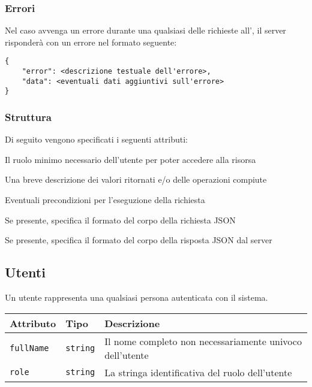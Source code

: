     \subsubsection{Errori}

        Nel caso avvenga un errore durante una qualsiasi delle richieste all', il server risponderà
        con un errore nel formato  seguente:

        \begin{lstlisting}[basicstyle={\ttfamily}]
{
    "error": <descrizione testuale dell'errore>,
    "data": <eventuali dati aggiuntivi sull'errore>
}
        \end{lstlisting}

    \subsubsection{Struttura}

        Di seguito vengono specificati i seguenti attributi:

        \begin{description}[style=multiline,leftmargin=3cm]
            \item[Ruolo minimo:] Il ruolo minimo necessario dell'utente per poter accedere
                alla risorsa
            \item[Descrizione:] Una breve descrizione dei valori ritornati e/o delle
                operazioni compiute
            \item[Precondizioni:] Eventuali precondizioni per l'eseguzione della richiesta
            \item[Argomenti:] Se presente, specifica il formato del corpo
                della richiesta JSON
            \item[Attributi:] Se presente, specifica il formato del corpo
                della risposta JSON dal server
        \end{description}

\subsection{Utenti}

    Un utente rappresenta una qualsiasi persona autenticata con il sistema.

    \begin{center}
        \begin{tabular}{ | l | l | l | } 
        \hline
            Attributo & Tipo & Descrizione \\
        \hline
            \texttt{fullName} & \texttt{string} & 
                Il nome completo non necessariamente univoco dell'utente \\
            \texttt{role} & \texttt{string} & 
                La stringa identificativa del ruolo dell'utente \\
        \hline
        \end{tabular}
    \end{center}

